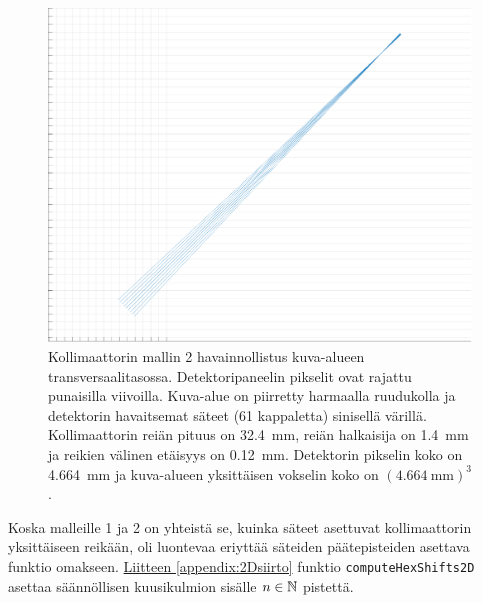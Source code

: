 \begin{figure}[H]
    \centering
    \captionsetup{width=.9\linewidth}
    \includegraphics[width=.9\linewidth]{kuvat/malli2_3D.pdf}
    \caption{Kollimaattorin mallin 2 havainnollistus kuva-alueen transversaalitasossa. Detektoripaneelin pikselit ovat rajattu punaisilla viivoilla. Kuva-alue on piirretty harmaalla ruudukolla ja detektorin havaitsemat säteet (61 kappaletta) sinisellä värillä. Kollimaattorin reiän pituus on \qty{32.4}{\milli\meter}, reiän halkaisija on \qty{1.4}{\milli\meter} ja reikien välinen etäisyys on \qty{0.12}{\milli\meter}. Detektorin pikselin koko on \qty{4.664}{\milli\meter} ja kuva-alueen yksittäisen vokselin koko on $(\qty{4.664}{\milli\meter})^{3}$.}
    \label{fig:ray2_3D}
\end{figure}

Koska malleille 1 ja 2 on yhteistä se, kuinka säteet asettuvat kollimaattorin yksittäiseen reikään, oli luontevaa eriyttää säteiden päätepisteiden asettava funktio omakseen. \hyperref[appendix:2Dsiirto]{Liitteen \ref*{appendix:2Dsiirto}} funktio \texttt{computeHexShifts2D} asettaa säännöllisen kuusikulmion sisälle $n\in\mathbb{N}$ pistettä.

